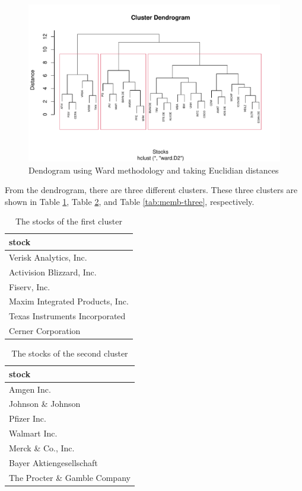\documentclass[11pt,a4paper,]{article}
\begin{document}
\begin{figure}
\centering
\includegraphics{ass2_files/figure-latex/ward-3-1.pdf}
\caption{\label{fig:ward-3}Dendogram using Ward methodology and taking Euclidian distances}
\end{figure}

From the dendrogram, there are three different clusters. These three clusters are shown in Table \ref{tab:memb-w}, Table \ref{tab:memb-two}, and Table \ref{tab:memb-three}, respectively.

\begin{table}

\caption{\label{tab:memb-w}The stocks of the first cluster}
\centering
\begin{tabular}[t]{l}
\hline
stock\\
\hline
Verisk Analytics, Inc.\\
\hline
Activision Blizzard, Inc.\\
\hline
Fiserv, Inc.\\
\hline
Maxim Integrated Products, Inc.\\
\hline
Texas Instruments Incorporated\\
\hline
Cerner Corporation\\
\hline
\end{tabular}
\end{table}

\begin{table}

\caption{\label{tab:memb-two}The stocks of the second cluster}
\centering
\begin{tabular}[t]{l}
\hline
stock\\
\hline
Amgen Inc.\\
\hline
Johnson \& Johnson\\
\hline
Pfizer Inc.\\
\hline
Walmart Inc.\\
\hline
Merck \& Co., Inc.\\
\hline
Bayer Aktiengesellschaft\\
\hline
The Procter \& Gamble Company\\
\hline
\end{tabular}
\end{table}
\end{document}
